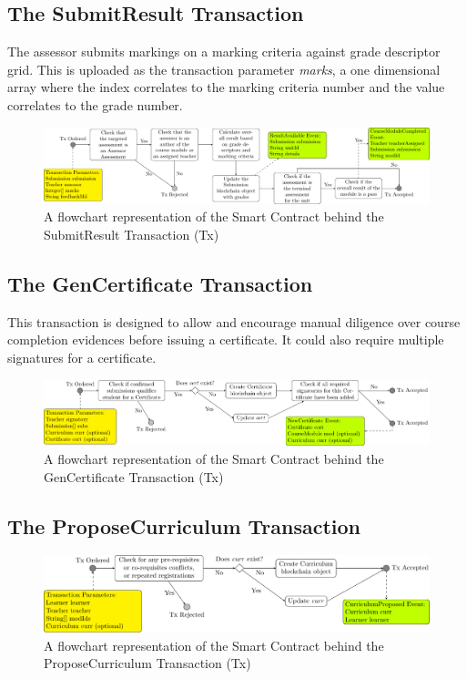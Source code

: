 \subsection{The SubmitResult Transaction}

The assessor submits markings on a marking criteria against grade descriptor grid. This is uploaded as the transaction
parameter \textit{marks}, a one dimensional array where the index correlates to the marking criteria number and
the value correlates to the grade number.

\begin{figure}[!ht]
	\centering
	\includegraphics[width=1.0\textwidth]{srtx}
	\caption{A flowchart representation of the Smart Contract behind the SubmitResult Transaction (Tx)} \label{fig:srtx}
\end{figure}

\subsection{The GenCertificate Transaction}

This transaction is designed to allow and encourage manual diligence over course completion evidences before issuing a certificate.
It could also require multiple signatures for a certificate.

\begin{figure}[!ht]
	\centering
	\includegraphics[width=1.0\textwidth]{gctx}
	\caption{A flowchart representation of the Smart Contract behind the GenCertificate Transaction (Tx)} \label{fig:gctx}
\end{figure}

\subsection{The ProposeCurriculum Transaction}

\begin{figure}[!ht]
	\centering
	\includegraphics[width=1.0\textwidth]{pctx}
	\caption{A flowchart representation of the Smart Contract behind the ProposeCurriculum Transaction (Tx)} \label{fig:pctx}
\end{figure}

